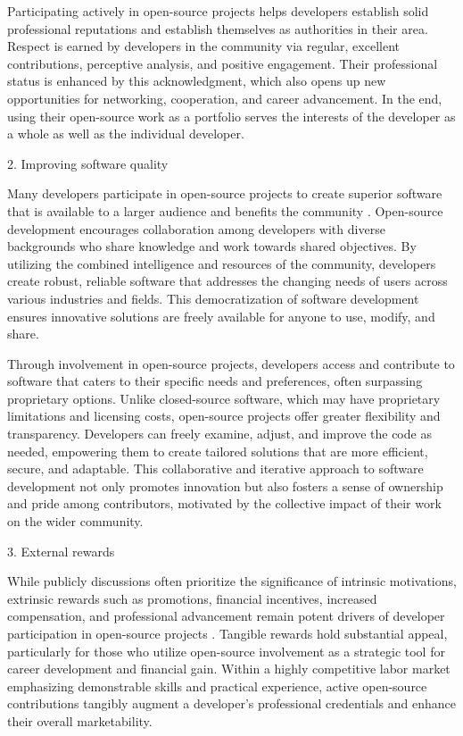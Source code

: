Participating actively in open-source projects helps developers establish solid professional reputations and establish themselves as authorities in their area. Respect is earned by developers in the community via regular, excellent contributions, perceptive analysis, and positive engagement. Their professional status is enhanced by this acknowledgment, which also opens up new opportunities for networking, cooperation, and career advancement. In the end, using their open-source work as a portfolio serves the interests of the developer as a whole as well as the individual developer.

2. Improving software quality


Many developers participate in open-source projects to create superior software that is available to a larger audience and benefits the community \cite{13li2012leadership,15roberts2006understanding}. Open-source development encourages collaboration among developers with diverse backgrounds who share knowledge and work towards shared objectives. By utilizing the combined intelligence and resources of the community, developers create robust, reliable software that addresses the changing needs of users across various industries and fields. This democratization of software development ensures innovative solutions are freely available for anyone to use, modify, and share.

Through involvement in open-source projects, developers access and contribute to software that caters to their specific needs and preferences, often surpassing proprietary options. Unlike closed-source software, which may have proprietary limitations and licensing costs, open-source projects offer greater flexibility and transparency. Developers can freely examine, adjust, and improve the code as needed, empowering them to create tailored solutions that are more efficient, secure, and adaptable. This collaborative and iterative approach to software development not only promotes innovation but also fosters a sense of ownership and pride among contributors, motivated by the collective impact of their work on the wider community.


3. External rewards

While publicly discussions often prioritize the significance of intrinsic motivations, extrinsic rewards such as promotions, financial incentives, increased compensation, and professional advancement remain potent drivers of developer participation in open-source projects \cite{05bitzer2007intrinsic,06ye2003toward,07zhao2024openrank,11gerosa2021shifting,13li2012leadership,15roberts2006understanding,17alexander2002working,18oreg2008exploring}. Tangible rewards hold substantial appeal, particularly for those who utilize open-source involvement as a strategic tool for career development and financial gain. Within a highly competitive labor market emphasizing demonstrable skills and practical experience, active open-source contributions tangibly augment a developer's professional credentials and enhance their overall marketability.

